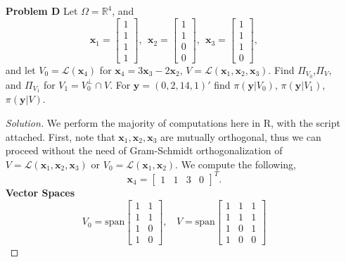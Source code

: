 \documentclass{amsart}
\begin{document}
\begin{enumerate}
		\item[\textbf{Problem D}] Let $\Omega = \mathbb{R}^{4}$, and $$\mathbf{x}_{1} = \begin{bmatrix}
			1 \\
			1 \\
			1 \\
			1
		\end{bmatrix}, \ \ 
		\mathbf{x}_{2} = \begin{bmatrix}
			1 \\
			1 \\
			0 \\
			0
		\end{bmatrix}, \ \ 
		\mathbf{x}_{3} = \begin{bmatrix}
			1 \\
			1 \\
			1 \\
			0
		\end{bmatrix},$$ and let $V_{0} = \mathscr{L}(\mathbf{x}_{4})$ for $\mathbf{x}_{4} =3 \mathbf{x}_{3}-2 \mathbf{x}_{2}$, $V = \mathscr{L}(\mathbf{x}_{1},\mathbf{x}_{2},\mathbf{x}_{3})$. 
		Find $\Pi_{V_{0}}$,$\Pi_{V}$, and $\Pi_{V_{1}}$ for $V_{1}=V_{0}^{\perp}\cap V $. 
		For $\mathbf{y}=(0,2,14,1)'$ find $\pi(\mathbf{y}|V_{0})$, $\pi(\mathbf{y}|V_{1})$, $\pi(\mathbf{y}|V)$.
		\begin{proof}[Solution] We perform the majority of computations here in R, with the script attached.
		First, note that $\mathbf{x}_{1}, \mathbf{x}_{2}, \mathbf{x}_{3}$ are mutually orthogonal, thus we can proceed without the need of Gram-Schmidt orthogonalization of $V = \mathscr{L}(\mathbf{x}_{1}, \mathbf{x}_{2}, \mathbf{x}_{3})$ or $V_{0} = \mathscr{L}(\mathbf{x}_{1}, \mathbf{x}_{2})$.
		We compute the following,
			$$\mathbf{x}_{4} = \begin{bmatrix}
						1 & 1 & 3 & 0
						\end{bmatrix}^{T}.
			$$
			\textbf{Vector Spaces}
			$$V_{0} = \text{span}\begin{bmatrix}
					1 & 1 \\
					1 & 1 \\
					1 & 0 \\
					1 & 0
					\end{bmatrix}, \ \ \ \ 
				V = \text{span}\begin{bmatrix}
					1 & 1 & 1 \\
					1 & 1 & 1 \\
					1 & 0 & 1 \\
					1 & 0 & 0
				\end{bmatrix}
$$
\end{proof}
\end{enumerate}
\end{document}
